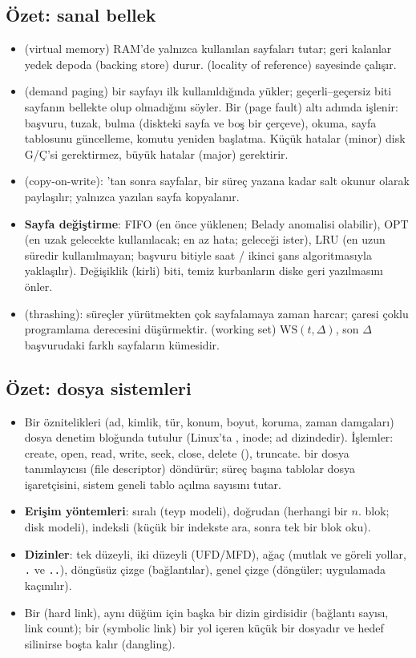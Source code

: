 \subsection*{Özet: sanal bellek}
\begin{itemize}
  \item {} (virtual memory) RAM'de yalnızca kullanılan sayfaları tutar; geri kalanlar yedek depoda (backing store) durur.  (locality of reference) sayesinde çalışır.
  \item {} (demand paging) bir sayfayı ilk kullanıldığında yükler; geçerli--geçersiz biti sayfanın bellekte olup olmadığını söyler. Bir  (page fault) altı adımda işlenir: başvuru, tuzak, bulma (diskteki sayfa ve boş bir çerçeve), okuma, sayfa tablosunu güncelleme, komutu yeniden başlatma. Küçük hatalar (minor) disk G/Ç'si gerektirmez, büyük hatalar (major) gerektirir.
  \item {} (copy-on-write): 'tan sonra sayfalar, bir süreç yazana kadar salt okunur olarak paylaşılır; yalnızca yazılan sayfa kopyalanır.
  \item \textbf{Sayfa değiştirme}: FIFO (en önce yüklenen; Belady anomalisi olabilir), OPT (en uzak gelecekte kullanılacak; en az hata; geleceği ister), LRU (en uzun süredir kullanılmayan; başvuru bitiyle saat / ikinci şans algoritmasıyla yaklaşılır). Değişiklik (kirli) biti, temiz kurbanların diske geri yazılmasını önler.
  \item {} (thrashing): süreçler yürütmekten çok sayfalamaya zaman harcar; çaresi çoklu programlama derecesini düşürmektir.  (working set) $\text{WS}(t,\Delta)$, son $\Delta$ başvurudaki farklı sayfaların kümesidir.
\end{itemize}
\subsection*{Özet: dosya sistemleri}
\begin{itemize}
  \item Bir  öznitelikleri (ad, kimlik, tür, konum, boyut, koruma, zaman damgaları) dosya denetim bloğunda tutulur (Linux'ta , inode; ad dizindedir). İşlemler: create, open, read, write, seek, close, delete (), truncate.  bir dosya tanımlayıcısı (file descriptor) döndürür; süreç başına tablolar dosya işaretçisini, sistem geneli tablo açılma sayısını tutar.
  \item \textbf{Erişim yöntemleri}: sıralı (teyp modeli), doğrudan (herhangi bir $n$. blok; disk modeli), indeksli (küçük bir indekste ara, sonra tek bir blok oku).
  \item \textbf{Dizinler}: tek düzeyli, iki düzeyli (UFD/MFD), ağaç (mutlak ve göreli yollar, \texttt{.} ve \texttt{..}), döngüsüz çizge (bağlantılar), genel çizge (döngüler; uygulamada kaçınılır).
  \item Bir  (hard link), aynı düğüm için başka bir dizin girdisidir (bağlantı sayısı, link count); bir  (symbolic link) bir yol içeren küçük bir dosyadır ve hedef silinirse boşta kalır (dangling).
\end{itemize}

